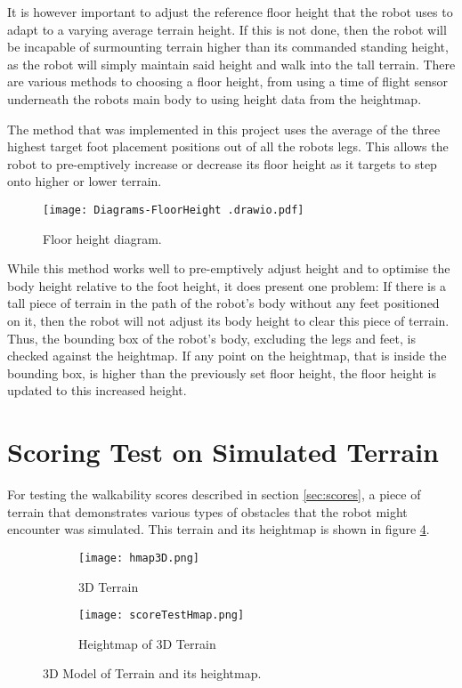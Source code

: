     It is however important to adjust the reference floor height that the robot uses to adapt to a varying average terrain height. If this is not done, then the robot will be incapable of surmounting terrain higher than its commanded standing height, as the robot will simply maintain said height and walk into the tall terrain. There are various methods to choosing a floor height, from using a time of flight sensor underneath the robots main body to using height data from the heightmap.

    The method that was implemented in this project uses the average of the three highest target foot placement positions out of all the robots legs. This allows the robot to pre-emptively increase or decrease its floor height as it targets to step onto higher or lower terrain.

    \begin{figure}[h]
        \centering
        \texttt{[image: Diagrams-FloorHeight .drawio.pdf]}
        \caption{Floor height diagram.}
        \label{fig:floor_height}
    \end{figure}

    \noindent
    While this method works well to pre-emptively adjust height and to optimise the body height relative to the foot height, it does present one problem: If there is a tall piece of terrain in the path of the robot's body without any feet positioned on it, then the robot will not adjust its body height to clear this piece of terrain. Thus, the bounding box of the robot's body, excluding the legs and feet, is checked against the heightmap. If any point on the heightmap, that is inside the bounding box, is higher than the previously set floor height, the floor height is updated to this increased height.

    \newpage
    \section{Scoring Test on Simulated Terrain} \label{sec:test_scores}
    For testing the walkability scores described in section \ref{sec:scores}, a piece of terrain that demonstrates various types of obstacles that the robot might encounter was simulated. This terrain and its heightmap is shown in figure \ref{fig:score_test_map}.
    \begin{figure}[h]
        \centering
        \begin{subfigure}{.5\textwidth}
            \texttt{[image: hmap3D.png]}
            \caption{3D Terrain}
            \label{fig:sub_3d_terrain}
        \end{subfigure}%
        \begin{subfigure}{.5\textwidth}
            \texttt{[image: scoreTestHmap.png]}
            \caption{Heightmap of 3D Terrain}
            \label{fig:sub_3d_terrain_hmap}
        \end{subfigure}
        \caption{3D Model of Terrain and its heightmap.}
        \label{fig:score_test_map}
    \end{figure}

